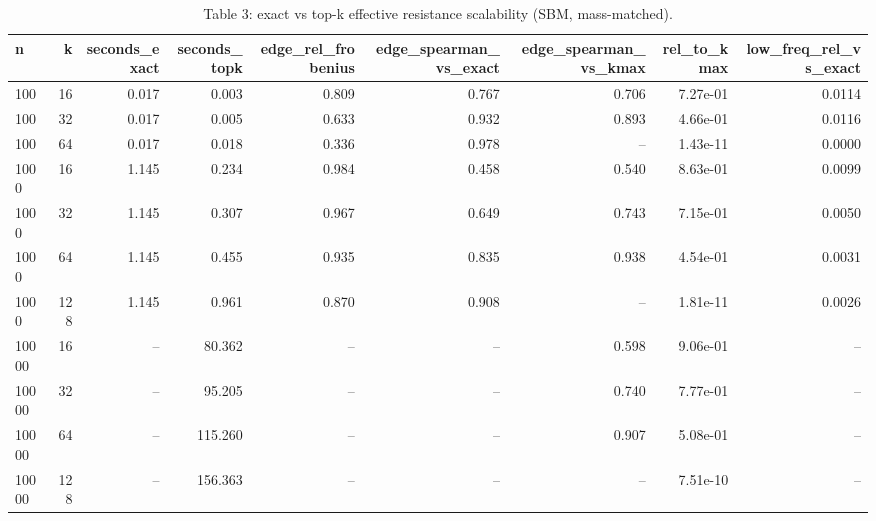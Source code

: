 \begin{table}[t]
\centering
\begin{tabular}{lrrrrrrrr}
\hline
n & k & seconds\_exact & seconds\_topk & edge\_rel\_frobenius & edge\_spearman\_vs\_exact & edge\_spearman\_vs\_kmax & rel\_to\_kmax & low\_freq\_rel\_vs\_exact \\
\hline
100 & 16 & 0.017 & 0.003 & 0.809 & 0.767 & 0.706 & 7.27e-01 & 0.0114 \\
100 & 32 & 0.017 & 0.005 & 0.633 & 0.932 & 0.893 & 4.66e-01 & 0.0116 \\
100 & 64 & 0.017 & 0.018 & 0.336 & 0.978 & -- & 1.43e-11 & 0.0000 \\
1000 & 16 & 1.145 & 0.234 & 0.984 & 0.458 & 0.540 & 8.63e-01 & 0.0099 \\
1000 & 32 & 1.145 & 0.307 & 0.967 & 0.649 & 0.743 & 7.15e-01 & 0.0050 \\
1000 & 64 & 1.145 & 0.455 & 0.935 & 0.835 & 0.938 & 4.54e-01 & 0.0031 \\
1000 & 128 & 1.145 & 0.961 & 0.870 & 0.908 & -- & 1.81e-11 & 0.0026 \\
10000 & 16 & -- & 80.362 & -- & -- & 0.598 & 9.06e-01 & -- \\
10000 & 32 & -- & 95.205 & -- & -- & 0.740 & 7.77e-01 & -- \\
10000 & 64 & -- & 115.260 & -- & -- & 0.907 & 5.08e-01 & -- \\
10000 & 128 & -- & 156.363 & -- & -- & -- & 7.51e-10 & -- \\
\hline
\end{tabular}
\caption{Table 3: exact vs top-k effective resistance scalability (SBM, mass-matched).}
\end{table}
